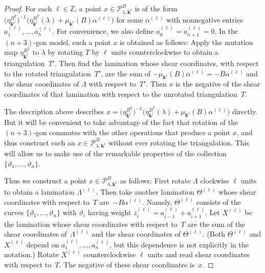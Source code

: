 \documentclass{amsart}
\theoremstyle{definition}
\theoremstyle{remark}
\numberwithin{equation}{section}
\newcommand{\integers}{\mathbb Z}
\newcommand{\thet}{\vartheta}
\newcommand{\set}[1]{{\lbrace #1 \rbrace}}
\newcommand{\0}{{\mathbf{0}}}
\newcommand{\kk}{{\boldsymbol{k}}}
\renewcommand{\P}{\mathcal{P}}
\begin{document}
\begin{proof}
For each $\ell\in\integers$, a point $x\in \P^B_{\lambda,\kk^\ell}$ is of the form $\bigl(\eta_{\kk^\ell}^{B^T}\bigr)^{-1}\bigl(\eta_{\kk^\ell}^{B^T}(\lambda)+\mu_{\kk^\ell}(B)\alpha^{(\ell)}\bigr)$ for some $\alpha^{(\ell)}$ with nonnegative entries $a_1^{(\ell)},\ldots,a_n^{(\ell)}$.
For convenience, we also define $a_0^{(\ell)}=a_{n+1}^{(\ell)}=0$.
In the $(n+3)$-gon model, such a point $x$ is obtained as follows:
Apply the mutation map $\eta^{B^T}_{\kk^\ell}$ to $\lambda$ by rotating $T$ by $\ell$ units counterclockwise to obtain a triangulation~$T'$.
Then find the lamination whose shear coordinates, with respect to the rotated triangulation~$T'$, are the sum of $-\mu_{\kk^\ell}(B)\alpha^{(\ell)}=-B\alpha^{(\ell)}$ and the shear coordinates of $\Lambda$ with respect to~$T'$.
Then $x$ is the negative of the shear coordinates of that lamination with respect to the unrotated triangulation~$T$.

The description above describes ${x=\bigl(\eta_{\kk^\ell}^{B^T}\bigr)^{-1}\bigl(\eta_{\kk^\ell}^{B^T}(\lambda)+\mu_{\kk^\ell}(B)\alpha^{(\ell)}}\bigr)$ directly.
But it will be convenient to take advantage of the fact that rotation of the $(n+3)$-gon commutes with the other operations that produce a point $x$, and thus construct such an $x\in \P^B_{\lambda,\kk^\ell}$ without ever rotating the triangulation.
This will allow us to make use of the remarkable properties of the collection $\set{\thet_1,\ldots,\thet_n}$.

Thus we construct a point $x\in \P^B_{\lambda,\kk^\ell}$ as follows:
First rotate $\Lambda$ clockwise $\ell$ units to obtain a lamination $\Lambda^{(\ell)}$.
Then take another lamination $\Theta^{(\ell)}$ whose shear coordinates with respect to~$T$ are~$-B\alpha^{(\ell)}$.
Namely, $\Theta^{(\ell)}$ consists of the curves $\set{\thet_1,\ldots,\thet_n}$ with $\thet_i$ having weight $z_i^{(\ell)}=a_{i-1}^{(\ell)}+a_{i+1}^{(\ell)}$. 
Let $X^{(\ell)}$ be the lamination whose shear coordinates with respect to~$T$ are the sum of the shear coordinates of~$\Lambda^{(\ell)}$ and the shear coordinates of $\Theta^{(\ell)}$.
(Both $\Theta^{(\ell)}$ and $X^{(\ell)}$ depend on $a_1^{(\ell)},\ldots,a_n^{(\ell)}$, but this dependence is not explicitly in the notation.)
Rotate $X^{(\ell)}$ counterclockwise $\ell$ units and read shear coordinates with respect to~$T$.
The negative of these shear coordinates is~$x$.


\end{proof}
\end{document}
